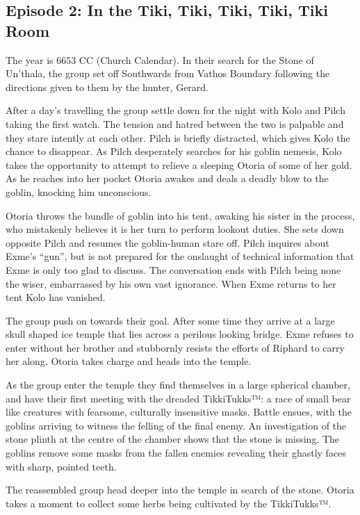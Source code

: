 \subsection{Episode 2: In the Tiki, Tiki, Tiki, Tiki, Tiki Room}

The year is 6653 CC (Church Calendar). In their search for the Stone of Un'thala, the group set off Southwards from Vathos Boundary following the directions given to them by the hunter, Gerard.\medskip

After a day’s travelling the group settle down for the night with Kolo and Pilch taking the first watch. The tension and hatred between the two is palpable and they stare intently at each other. Pilch is briefly distracted, which gives Kolo the chance to disappear. As Pilch desperately searches for his goblin nemesis, Kolo takes the opportunity to attempt to relieve a sleeping Otoria of some of her gold. As he reaches into her pocket Otoria awakes and deals a deadly blow to the goblin, knocking him unconscious.\medskip

Otoria throws the bundle of goblin into his tent, awaking his sister in the process, who mistakenly believes it is her turn to perform lookout duties. She sets down opposite Pilch and resumes the goblin-human stare off. Pilch inquires about Exme’s “gun”, but is not prepared for the onslaught of technical information that Exme is only too glad to discuss. The conversation ends with Pilch being none the wiser, embarrassed by his own vast ignorance. When Exme returns to her tent Kolo has vanished.\medskip

The group push on towards their goal. After some time they arrive at a large skull shaped ice temple that lies across a perilous looking bridge. Exme refuses to enter without her brother and stubbornly resists the efforts of Riphard to carry her along. Otoria takes charge and heads into the temple.\medskip

As the group enter the temple they find themselves in a large spherical chamber, and have their first meeting with the dreaded TikkiTukks™: a race of small bear like creatures with fearsome, culturally insensitive masks. Battle ensues, with the goblins arriving to witness the felling of the final enemy. An investigation of the stone plinth at the centre of the chamber shows that the stone is missing. The goblins remove some masks from the fallen enemies revealing their ghastly faces with sharp, pointed teeth.\medskip

The reassembled group head deeper into the temple in search of the stone. Otoria takes a moment to collect some herbs being cultivated by the TikkiTukks™.\medskip

